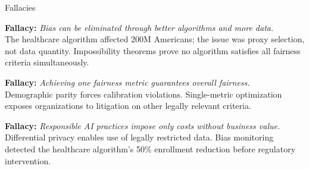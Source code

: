 \documentclass[aspectratio=169, 12pt]{beamer}
\begin{document}
\begin{frame}{Fallacies}

\footnotesize
\textbf{Fallacy:} \textit{Bias can be eliminated through better algorithms and more data.}\\
{\scriptsize The healthcare algorithm affected 200M Americans; the issue was proxy selection, not data quantity. Impossibility theorems prove no algorithm satisfies all fairness criteria simultaneously.}

\vspace{0.08cm}
\textbf{Fallacy:} \textit{Achieving one fairness metric guarantees overall fairness.}\\
{\scriptsize Demographic parity forces calibration violations. Single-metric optimization exposes organizations to litigation on other legally relevant criteria.}

\vspace{0.08cm}
\textbf{Fallacy:} \textit{Responsible AI practices impose only costs without business value.}\\
{\scriptsize Differential privacy enables use of legally restricted data. Bias monitoring detected the healthcare algorithm's 50\% enrollment reduction before regulatory intervention.}

\end{frame}
\end{document}
